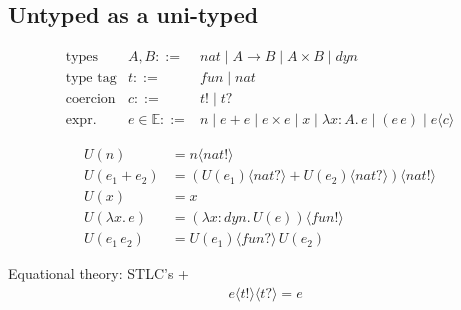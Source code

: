 \documentclass{tufte-handout}
\newcommand{\LAM}[1]{\lambda #1.\,}
\newcommand{\APP}[0]{\,}
\newcommand{\of}[0]{\!:\!}
\begin{document}
\subsection{Untyped as a uni-typed}

\[
\begin{array}{lrl}
 \text{types} & A,B ::= & \mathit{nat} \mid A \to B \mid A \times B \mid \mathit{dyn} \\
 \text{type tag}  & t ::= & \mathit{fun} \mid \mathit{nat} \\
 \text{coercion} & c ::= & t! \mid t? \\
 \text{expr.}& e \in\mathbb{E} ::=& n \mid e + e \mid e \times e \mid x \mid \LAM{x \of A} e \mid (e \, e) \mid e \langle c \rangle
\end{array}
\]

\newcommand{\uni}[1]{U(#1)}
\newcommand{\coerce}[2]{#1\langle #2\rangle}

\begin{align*}
  \uni{n} &= \coerce{n}{\mathit{nat}!} \\
  \uni{e_1 + e_2} &= \coerce{(\coerce{\uni{e_1}}{\mathit{nat}?} +
    \coerce{\uni{e_2}}{\mathit{nat}?})}{\mathit{nat}!} \\
  \uni{x} &= x \\
  \uni{\LAM{x} e} &= \coerce{(\LAM{x\of \mathit{dyn}} \uni{e})}{\mathit{fun}!}\\
  \uni{e_1 \APP e_2} &= 
     \coerce{\uni{e_1}}{\mathit{fun}?} \APP \uni{e_2}
\end{align*}

\noindent Equational theory: STLC's + 
\[
\begin{array}{lc}
  & \coerce{\coerce{e}{t!}}{t?} = e
\end{array}
\]
\end{document}
